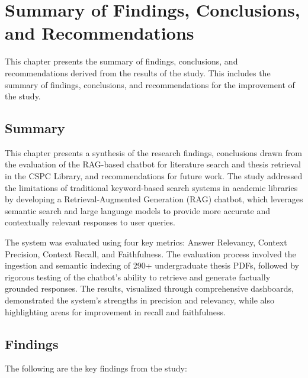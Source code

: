 \chapter{Summary of Findings, Conclusions, and Recommendations}
\begin{refsection}

This chapter presents the summary of findings, conclusions, and recommendations derived from the results of the study. This includes the summary of findings, conclusions, and recommendations for the improvement of the study.

\section*{Summary}

This chapter presents a synthesis of the research findings, conclusions drawn from the evaluation of the RAG-based chatbot for literature search and thesis retrieval in the CSPC Library, and recommendations for future work. The study addressed the limitations of traditional keyword-based search systems in academic libraries by developing a Retrieval-Augmented Generation (RAG) chatbot, which leverages semantic search and large language models to provide more accurate and contextually relevant responses to user queries.

The system was evaluated using four key metrics: Answer Relevancy, Context Precision, Context Recall, and Faithfulness. The evaluation process involved the ingestion and semantic indexing of 290+ undergraduate thesis PDFs, followed by rigorous testing of the chatbot’s ability to retrieve and generate factually grounded responses. The results, visualized through comprehensive dashboards, demonstrated the system’s strengths in precision and relevancy, while also highlighting areas for improvement in recall and faithfulness.

\section*{Findings}

The following are the key findings from the study:


\end{refsection}
